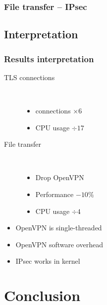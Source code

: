 \documentclass[xcolor={x11names, rgb, usenames, dvipsnames}]{beamer}
\newcommand\Wider[2][3em]{%
\makebox[\linewidth][c]{%
  \begin{minipage}{\dimexpr\textwidth+#1\relax}
  \raggedright#2
  \end{minipage}%
  }%
}
\begin{document}
\begin{frame}
\frametitle{File transfer -- IPsec}
\Wider[1em]{%
	\begin{minipage}[c]{.48\linewidth}
		\begin{tikzpicture}
		
		\end{tikzpicture}
	\end{minipage} \hfill
	\begin{minipage}[c]{.44\linewidth}
		\begin{tikzpicture}
		
		\end{tikzpicture}
		\vspace{0.7cm}
	\end{minipage}
}
\end{frame}


\subsection{Interpretation}
\begin{frame}
\frametitle{Results interpretation}
\begin{description}
	\item[TLS connections]~\\
		\begin{itemize}
			\item connections $\times 6$
			\item CPU usage $\div 17$
		\end{itemize}
	\item[File transfer]~\\
		\begin{itemize}
			\item Drop OpenVPN
			\item Performance $-10\%$
			\item CPU usage $\div 4$
		\end{itemize}
\end{description}

\begin{itemize}
	\item OpenVPN is single-threaded
	\item OpenVPN software overhead
	\item IPsec works in kernel
\end{itemize}
\end{frame}


\section{Conclusion}
\end{document}
